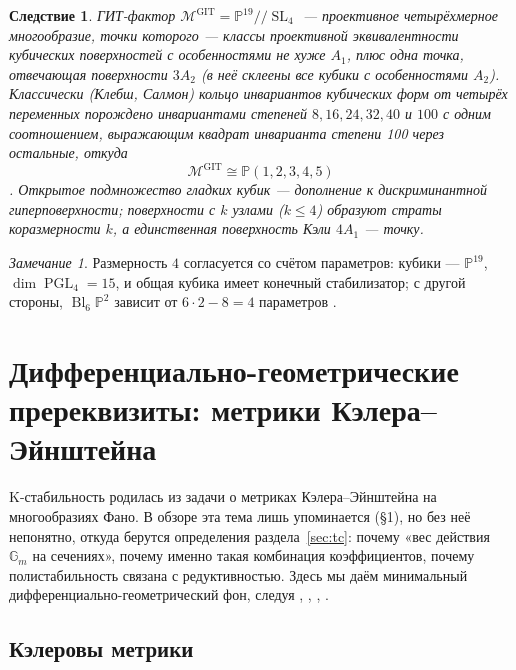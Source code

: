 \documentclass[11pt,a4paper]{article}
\theoremstyle{plain}
\newtheorem{corollary}[theorem]{Следствие}
\theoremstyle{definition}
\theoremstyle{remark}
\newtheorem{remark}[theorem]{Замечание}
\newcommand{\PP}{\mathbb{P}}
\newcommand{\Gm}{\mathbb{G}_m}
\newcommand{\cM}{\mathcal{M}}
\DeclareMathOperator{\Bl}{Bl}
\DeclareMathOperator{\SL}{SL}
\DeclareMathOperator{\PGL}{PGL}
\begin{document}
\begin{corollary}\label{cor:GIT-cubic}
ГИТ-фактор $\cM^{\mathrm{GIT}}=\PP^{19}/\!/\SL_4$ --- проективное четырёхмерное многообразие, точки
которого --- классы проективной эквивалентности кубических поверхностей с особенностями не хуже
$A_1$, плюс одна точка, отвечающая поверхности $3A_2$ (в неё склеены все кубики с особенностями
$A_2$). Классически (Клебш, Салмон) кольцо инвариантов кубических форм от четырёх переменных
порождено инвариантами степеней $8,16,24,32,40$ и $100$ с одним соотношением, выражающим квадрат
инварианта степени 100 через остальные, откуда
\[
\cM^{\mathrm{GIT}}\cong\PP(1,2,3,4,5)
\]
\cite[\S\,10]{Dolg-IT}. Открытое подмножество гладких кубик --- дополнение к дискриминантной
гиперповерхности; поверхности с $k$ узлами ($k\le4$) образуют страты коразмерности $k$, а единственная
поверхность Кэли $4A_1$ --- точку.
\end{corollary}

\begin{remark}
Размерность $4$ согласуется со счётом параметров: кубики --- $\PP^{19}$, $\dim\PGL_4=15$, и
общая кубика имеет конечный стабилизатор; с другой стороны, $\Bl_6\PP^2$ зависит от
$6\cdot2-8=4$ параметров \cite[замечание после 8.13]{AG}.
\end{remark}

\section{Дифференциально-геометрические пререквизиты: метрики Кэлера--Эйнштейна}\label{sec:dg}

K-стабильность родилась из задачи о метриках Кэлера--Эйнштейна на многообразиях Фано. В обзоре
\cite{DeV} эта тема лишь упоминается (\S1), но без неё непонятно, откуда берутся определения
раздела~\ref{sec:tc}: почему «вес действия $\Gm$ на сечениях», почему именно такая комбинация
коэффициентов, почему полистабильность связана с редуктивностью. Здесь мы даём минимальный
дифференциально-геометрический фон, следуя \cite{Sz}, \cite{Tian-book}, \cite[гл.~0, 1]{GH},
\cite[\S\,6.2]{AG}.

\subsection{Кэлеровы метрики}
\end{document}
